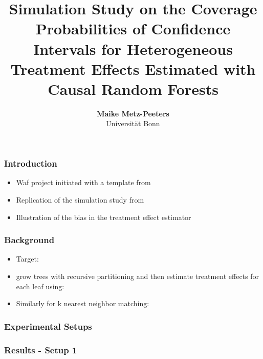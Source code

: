 \documentclass[11pt]{beamer}
\begin{document}
\title{ Simulation Study on the Coverage Probabilities of Confidence Intervals for Heterogeneous Treatment Effects Estimated with Causal Random Forests}

\author[Maike Metz-Peeters]
{
{\bf Maike Metz-Peeters}\\
{\small Universität Bonn}\\[1ex]
}


\begin{frame}
    \titlepage
    \note{~}
\end{frame}



\begin{frame}
    \frametitle{Introduction}
    \begin{itemize}
        \item Waf project initiated with a template from \citet{GaudeckerEconProjectTemplates}
        \item Replication of the simulation study from \citet{wa18}
        \item Illustration of the bias in the treatment effect estimator
    \end{itemize}
\end{frame}

\begin{frame}
    \frametitle{Background}
    \begin{itemize}
        \item Target: 
        \item \citet{wa18} grow trees with recursive partitioning and then estimate treatment effects for each leaf using: 
        
        \item Similarly for k nearest neighbor matching: 
    \end{itemize}
\end{frame}

\begin{frame}
    \frametitle{Experimental Setups}

    

\end{frame}



\begin{frame}
    \frametitle{Results - Setup 1}
    
    

\end{frame}
\end{document}

